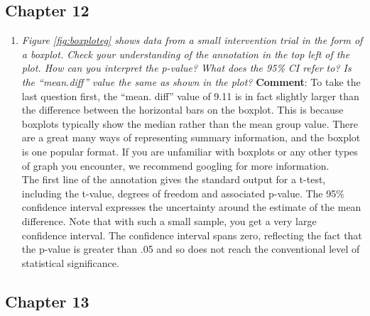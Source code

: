 \documentclass{krantz}
\providecommand{\tightlist}{%
\setlength{\itemsep}{0pt}\setlength{\parskip}{0pt}}
\begin{document}
\hypertarget{chapter-12}{%
\subsection{Chapter 12}\label{chapter-12}}

\begin{enumerate}
\def\labelenumi{\arabic{enumi}.}
\tightlist
\item
  \emph{Figure \ref{fig:boxploteg} shows data from a small intervention trial in the form of a boxplot. Check your understanding of the annotation in the top left of the plot. How can you interpret the p-value? What does the 95\% CI refer to? Is the ``mean.diff'' value the same as shown in the plot?}
  \textbf{Comment}: To take the last question first, the ``mean. diff'' value of 9.11 is in fact slightly larger than the difference between the horizontal bars on the boxplot. This is because boxplots typically show the median rather than the mean group value. There are a great many ways of representing summary information, and the boxplot is one popular format. If you are unfamiliar with boxplots or any other types of graph you encounter, we recommend googling for more information.\\
  The first line of the annotation gives the standard output for a t-test, including the t-value, degrees of freedom and associated p-value. The 95\% confidence interval expresses the uncertainty around the estimate of the mean difference. Note that with such a small sample, you get a very large confidence interval. The confidence interval spans zero, reflecting the fact that the p-value is greater than .05 and so does not reach the conventional level of statistical significance.
\end{enumerate}

\hypertarget{chapter-13}{%
\subsection{Chapter 13}\label{chapter-13}}
\end{document}
